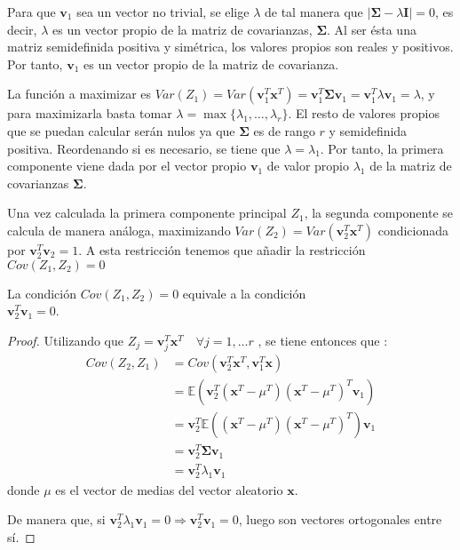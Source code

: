 \noindent Para que $\textbf{v}_1$ sea un vector no trivial, se elige $\lambda$ de tal manera que $|\mathbf{\Sigma}-\lambda \mathbf{I}| = 0$, es decir, $\lambda$ es un vector propio de la matriz de covarianzas, $\mathbf{\Sigma}$. Al ser ésta una matriz semidefinida positiva y simétrica, los valores propios son reales y positivos. Por tanto, $\textbf{v}_1$ es un vector propio de la matriz de covarianza.

\noindent La función a maximizar es $Var(Z_1)=Var(\textbf{v}_1^T\textbf{x}^T)=\textbf{v}_1^T\mathbf{\Sigma} \textbf{v}_1=\textbf{v}_1^T\lambda \textbf{v}_1=\lambda$, y para maximizarla basta tomar $\lambda=\max{\lbrace\lambda_1,\ldots, \lambda_r\rbrace}$. El resto de valores propios que se puedan calcular serán nulos ya que $\mathbf{\Sigma}$ es de rango $r$ y semidefinida positiva. Reordenando si es necesario, se tiene que $\lambda=\lambda_1$. Por tanto, la primera componente viene dada por el vector propio $\mathbf{v}_1$ de valor propio $\lambda_1$ de la matriz de covarianzas $\mathbf{\Sigma}$.

\noindent Una vez calculada la primera componente principal $Z_1$, la segunda componente se calcula de manera análoga, maximizando $Var(Z_2)=Var(\textbf{v}_2^T\textbf{x}^T)$ condicionada por $\textbf{v}_2^T\textbf{v}_2=1$. A esta restricción tenemos que añadir la restricción $Cov(Z_1,Z_2)=0 $

\begin{propo}
La condición $Cov(Z_1,Z_2)=0 $ equivale a la condición \\$\textbf{v}_2^T\textbf{v}_1 = 0$.
\begin{proof}
Utilizando que $Z_j=\textbf{v}_j^T \textbf{x}^T \quad \forall j=1,\ldots r$ , se tiene entonces que :
\begin{align*}
Cov(Z_2,Z_1)&= Cov (\textbf{v}_2^T\mathbf{x}^T,\mathbf{v}_1^T\mathbf{x})\\ 
&= \mathbb{E}(\mathbf{v}_2^T(\mathbf{x}^T-\mu^T)(\mathbf{x}^T-\mu^T)^T \mathbf{v}_1)\\
&= \textbf{v}_2^T \mathbb{E}((\textbf{x}^T-\mu^T)(\mathbf{x}^T-\mu^T)^T) \textbf{v}_1\\
&= \textbf{v}_2^T \mathbf{\Sigma} \textbf{v}_1 \\
&=\textbf{v}_2^T \lambda_1 \textbf{v}_1
\end{align*}
\noindent donde $\mu$ es el vector de medias del vector aleatorio $\mathbf{x}$. 

\noindent De manera que, si $\mathbf{v}_2^T \lambda_1 \mathbf{v}_1 = 0 \Rightarrow \mathbf{v}_2^T \mathbf{v}_1=0 $, luego son vectores ortogonales entre sí. 
\end{proof}
\end{propo}


